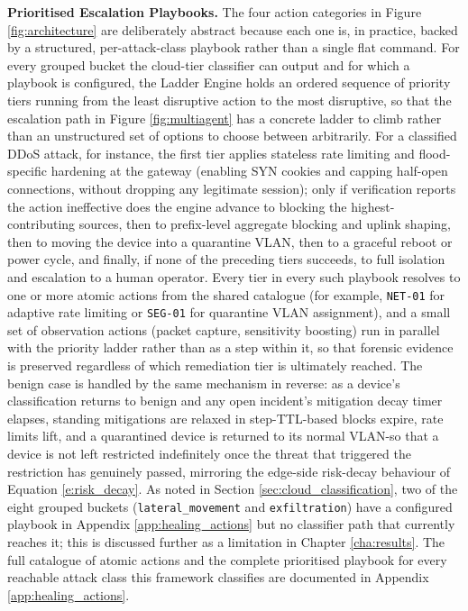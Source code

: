 \textbf{Prioritised Escalation Playbooks.} The four action categories in Figure \ref{fig:architecture} are deliberately abstract because each one is, in practice, backed by a structured, per-attack-class playbook rather than a single flat command. For every grouped bucket the cloud-tier classifier can output and for which a playbook is configured, the Ladder Engine holds an ordered sequence of priority tiers running from the least disruptive action to the most disruptive, so that the escalation path in Figure \ref{fig:multiagent} has a concrete ladder to climb rather than an unstructured set of options to choose between arbitrarily. For a classified DDoS attack, for instance, the first tier applies stateless rate limiting and flood-specific hardening at the gateway (enabling SYN cookies and capping half-open connections, without dropping any legitimate session); only if verification reports the action ineffective does the engine advance to blocking the highest-contributing sources, then to prefix-level aggregate blocking and uplink shaping, then to moving the device into a quarantine VLAN, then to a graceful reboot or power cycle, and finally, if none of the preceding tiers succeeds, to full isolation and escalation to a human operator. Every tier in every such playbook resolves to one or more atomic actions from the shared catalogue (for example, \texttt{NET-01} for adaptive rate limiting or \texttt{SEG-01} for quarantine VLAN assignment), and a small set of observation actions (packet capture, sensitivity boosting) run in parallel with the priority ladder rather than as a step within it, so that forensic evidence is preserved regardless of which remediation tier is ultimately reached. The benign case is handled by the same mechanism in reverse: as a device's classification returns to benign and any open incident's mitigation decay timer elapses, standing mitigations are relaxed in step-TTL-based blocks expire, rate limits lift, and a quarantined device is returned to its normal VLAN-so that a device is not left restricted indefinitely once the threat that triggered the restriction has genuinely passed, mirroring the edge-side risk-decay behaviour of Equation \ref{e:risk_decay}. As noted in Section \ref{sec:cloud_classification}, two of the eight grouped buckets (\texttt{lateral\_movement} and \texttt{exfiltration}) have a configured playbook in Appendix \ref{app:healing_actions} but no classifier path that currently reaches it; this is discussed further as a limitation in Chapter \ref{cha:results}. The full catalogue of atomic actions and the complete prioritised playbook for every reachable attack class this framework classifies are documented in Appendix \ref{app:healing_actions}.

